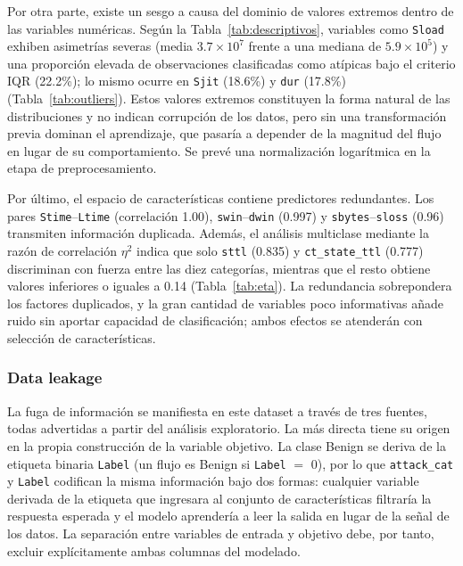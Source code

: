 \documentclass[conference]{IEEEtran}
\begin{document}
Por otra parte, existe un sesgo a causa del dominio de valores extremos dentro de las variables numéricas. Según la Tabla~\ref{tab:descriptivos}, variables como \texttt{Sload} exhiben asimetrías severas (media $3.7\times10^{7}$ frente a una mediana de $5.9\times10^{5}$) y una proporción elevada de observaciones clasificadas como atípicas bajo el criterio IQR (22.2\%); lo mismo ocurre en \texttt{Sjit} (18.6\%) y \texttt{dur} (17.8\%) (Tabla~\ref{tab:outliers}). Estos valores extremos constituyen la forma natural de las distribuciones y no indican corrupción de los datos, pero sin una transformación previa dominan el aprendizaje, que pasaría a depender de la magnitud del flujo en lugar de su comportamiento. Se prevé una normalización logarítmica en la etapa de preprocesamiento.

Por último, el espacio de características contiene predictores redundantes. Los pares \texttt{Stime}--\texttt{Ltime} (correlación 1.00), \texttt{swin}--\texttt{dwin} (0.997) y \texttt{sbytes}--\texttt{sloss} (0.96) transmiten información duplicada. Además, el análisis multiclase mediante la razón de correlación $\eta^{2}$ indica que solo \texttt{sttl} (0.835) y \texttt{ct\_state\_ttl} (0.777) discriminan con fuerza entre las diez categorías, mientras que el resto obtiene valores inferiores o iguales a 0.14 (Tabla~\ref{tab:eta}). La redundancia sobrepondera los factores duplicados, y la gran cantidad de variables poco informativas añade ruido sin aportar capacidad de clasificación; ambos efectos se atenderán con selección de características.

\subsubsection{Data leakage}

La fuga de información se manifiesta en este dataset a través de tres fuentes, todas advertidas a partir del análisis exploratorio. La más directa tiene su origen en la propia construcción de la variable objetivo. La clase Benign se deriva de la etiqueta binaria \texttt{Label} (un flujo es Benign si \texttt{Label} $=$ 0), por lo que \texttt{attack\_cat} y \texttt{Label} codifican la misma información bajo dos formas: cualquier variable derivada de la etiqueta que ingresara al conjunto de características filtraría la respuesta esperada y el modelo aprendería a leer la salida en lugar de la señal de los datos. La separación entre variables de entrada y objetivo debe, por tanto, excluir explícitamente ambas columnas del modelado.
\end{document}
